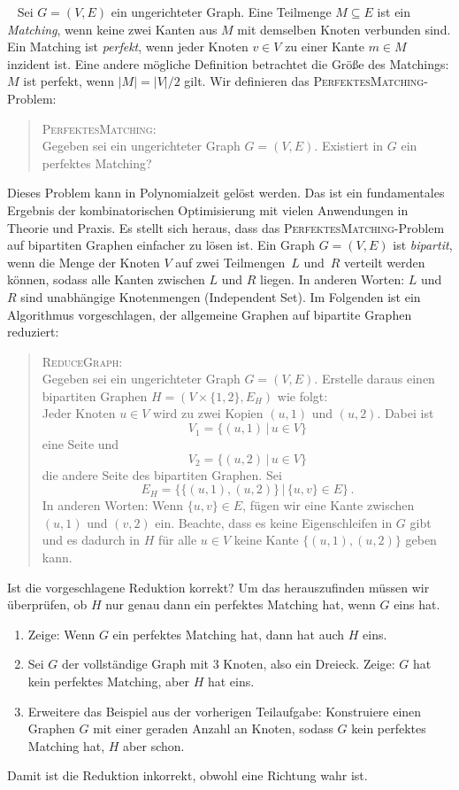 \documentclass{uebung_cs}
\begin{document}
\begin{aufgabe}\
	Sei $G = (V,E)$ ein ungerichteter Graph. Eine Teilmenge $M \subseteq E$ ist ein \textit{Matching}, wenn keine zwei Kanten aus $M$ mit demselben Knoten verbunden sind. Ein Matching ist \textit{perfekt}, wenn jeder Knoten $v \in V$ zu einer Kante $m \in M$ inzident ist. Eine andere mögliche Definition betrachtet die Größe des Matchings: $M$ ist perfekt, wenn $|M| = |V|/2$ gilt. Wir definieren das \textsc{PerfektesMatching}-Problem:
	\begin{quote}
		\textsc{PerfektesMatching}:\\
		Gegeben sei ein ungerichteter Graph $G = (V,E)$. Existiert in $G$ ein perfektes Matching?
	\end{quote}
	Dieses Problem kann in Polynomialzeit gelöst werden. Das ist ein fundamentales Ergebnis der kombinatorischen Optimisierung mit vielen Anwendungen in Theorie und Praxis. Es stellt sich heraus, dass das \textsc{PerfektesMatching}-Problem auf bipartiten Graphen einfacher zu lösen ist. Ein Graph $G = (V,E)$ ist \textit{bipartit}, wenn die Menge der Knoten $V$ auf zwei Teilmengen~$L$ und~$R$ verteilt werden können, sodass alle Kanten zwischen $L$ und $R$ liegen. In anderen Worten: $L$ und $R$ sind unabhängige Knotenmengen (Independent Set). Im Folgenden ist ein Algorithmus vorgeschlagen, der allgemeine Graphen auf bipartite Graphen reduziert:
	\begin{quote}
		\textsc{ReduceGraph}:\\
		Gegeben sei ein ungerichteter Graph $G = (V,E)$. Erstelle daraus einen bipartiten Graphen $H = (V \times \{1,2\},E_H)$ wie folgt:\\
		Jeder Knoten $u \in V$ wird zu zwei Kopien $(u,1)$ und $(u,2)$. Dabei ist \[V_1 = \{(u,1)\,|\,u\in V\}\] eine Seite und \[V_2 = \{(u,2)\,|\,u\in V\}\] die andere Seite des bipartiten Graphen. Sei \[E_H = \{\{(u,1),(u,2)\}\,|\,\{u,v\} \in E\}\,.\] In anderen Worten: Wenn $\{u,v\} \in E$, fügen wir eine Kante zwischen $(u,1)$ und $(v,2)$ ein. Beachte, dass es keine Eigenschleifen in $G$ gibt und es dadurch in $H$ für alle $u \in V$ keine Kante  $\{(u,1),(u,2)\}$ geben kann.
	\end{quote}
	Ist die vorgeschlagene Reduktion korrekt? Um das herauszufinden müssen wir überprüfen, ob $H$ nur genau dann ein perfektes Matching hat, wenn $G$ eins hat.
	\begin{enumerate}
		\item Zeige: Wenn $G$ ein perfektes Matching hat, dann hat auch $H$ eins.
		\item Sei $G$ der vollständige Graph mit $3$ Knoten, also ein Dreieck. Zeige: $G$ hat kein perfektes Matching, aber $H$ hat eins.
		\item Erweitere das Beispiel aus der vorherigen Teilaufgabe: Konstruiere einen Graphen $G$ mit einer geraden Anzahl an Knoten, sodass $G$ kein perfektes Matching hat, $H$ aber schon.
	\end{enumerate}
	Damit ist die Reduktion inkorrekt, obwohl eine Richtung wahr ist.
\end{aufgabe}
\end{document}
